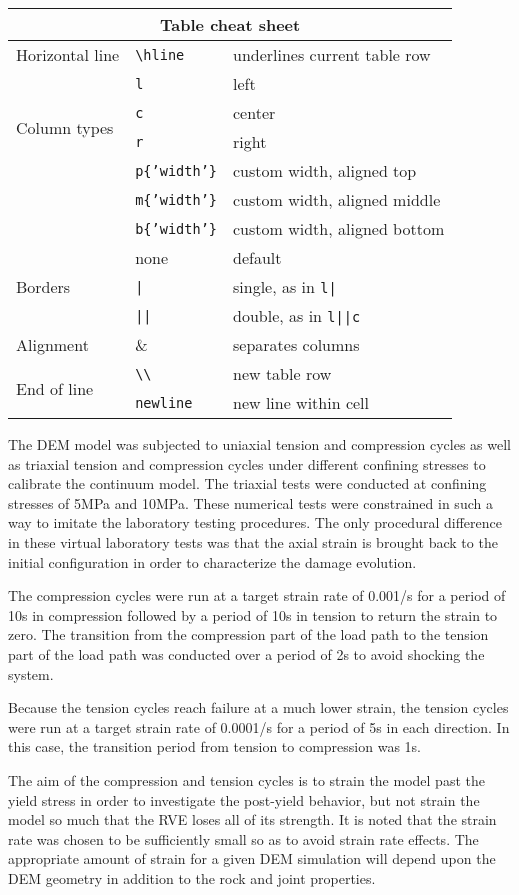 \begin{table}
\begin{tabular}{|l|l|l|}
\hline
\multicolumn{3}{|c|}{Table cheat sheet} \\
\hline
Horizontal line & \verb|\hline| & underlines current table row \\ \hline
\multirow{4}{*}{Column types} & \verb|l| & left \\
 & \verb.c. & center\\
 & \verb.r. & right\\
 & \verb,p{’width’}, & custom width, aligned top \\
 & \verb,m{’width’}, & custom width, aligned middle \\
 & \verb,b{’width’}, & custom width, aligned bottom \\ \hline
\multirow{3}{*}{Borders} & none & default \\
 & \verb.|. & single, as in \verb.l|. \\
 & \verb.||. & double, as in \verb.l||c. \\ \hline
Alignment & \& & separates columns \\ \hline
\multirow{2}{*}{End of line} & \verb|\\| & new table row \\
 & \verb|newline| & new line within cell \\
\hline
\end{tabular}
\end{table}


The DEM model was subjected to uniaxial tension and compression cycles as well as triaxial tension and compression cycles under different confining stresses to calibrate the continuum model. The triaxial tests were conducted at confining stresses of 5MPa and 10MPa. These numerical tests were constrained in such a way to imitate the laboratory testing procedures. The only procedural difference in these virtual laboratory tests was that the axial strain is brought back to the initial configuration in order to characterize the damage evolution. 

The compression cycles were run at a target strain rate of 0.001/s for a period of 10s in compression followed by a period of 10s in tension to return the strain to zero. The transition from the compression part of the load path to the tension part of the load path was conducted over a period of 2s to avoid shocking the system.

Because the tension cycles reach failure at a much lower strain, the tension cycles were run at a target strain rate of 0.0001/s for a period of 5s in each direction. In this case, the transition period from tension to compression was  1s.

The aim of the compression and tension cycles is to strain the model past the yield stress in order to investigate the post-yield behavior, but not strain the model so much that the RVE loses all of its strength. It is noted that the strain rate was chosen to be sufficiently small so as to avoid strain rate effects. The appropriate amount of strain for a given DEM simulation will depend upon the DEM geometry in addition to the rock and joint properties. 

